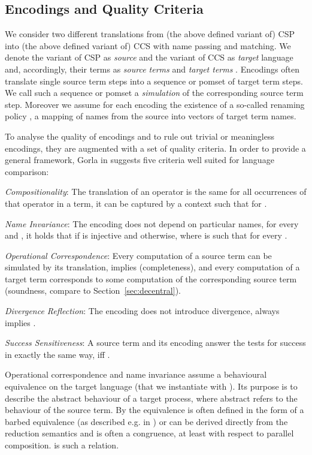 \documentclass[]{eptcs}
\begin{document}
\subsection{Encodings and Quality Criteria}

We consider two different translations from (the above defined variant of) CSP into (the above defined variant of) CCS with name passing and matching. We denote the variant of CSP as \emph{source} and the variant of CCS as \emph{target} language and, accordingly, their terms as \emph{source terms}  and \emph{target terms} . Encodings often translate single source term steps into a sequence or pomset of target term steps. We call such a sequence or pomset a \emph{simulation} of the corresponding source term step.
Moreover we assume for each encoding the existence of a so-called renaming policy , \ie a mapping of names from the source into vectors of target term names.

To analyse the quality of encodings and to rule out trivial or meaningless encodings, they are augmented with a set of quality criteria. In order to provide a general framework, Gorla in \cite{gorla10} suggests five criteria well suited for language comparison:
\begin{compactenum}[(1)]
	\item \emph{Compositionality}: The translation of an operator  is the same for all occurrences of that operator in a term, \ie it can be captured by a context  such that  for .
	\item \emph{Name Invariance}: The encoding does not depend on particular names, \ie for every  and , it holds that  if  is injective and  otherwise, where  is such that  for every .
	\item \emph{Operational Correspondence}: Every computation of a source term can be simulated by its translation, \ie  implies  (completeness), and every computation of a target term corresponds to some computation of the corresponding source term (soundness, compare to Section~\ref{sec:decentral}).
	\item \emph{Divergence Reflection}: The encoding does not introduce divergence, \ie  always implies .
	\item \emph{Success Sensitiveness}: A source term and its encoding answer the tests for success in exactly the same way, \ie  iff .
\end{compactenum}
Operational correspondence and name invariance assume a behavioural equivalence  on the target language (that we instantiate with ). Its purpose is to describe the abstract behaviour of a target process, where abstract refers to the behaviour of the source term. By \cite{gorla10} the equivalence  is often defined in the form of a barbed equivalence (as described e.g. in \cite{milner.sangiorgi:barbed-bisimulation}) or can be derived directly from the reduction semantics and is often a congruence, at least with respect to parallel composition.  is such a relation.
\end{document}
